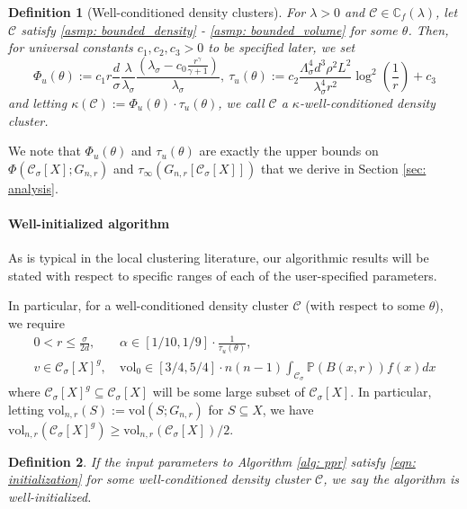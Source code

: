 \documentclass{article}
\newcommand{\vol}{\mathrm{vol}}
\newcommand{\1}{\mathbf{1}}
\newcommand{\Phibf}{\Phi_{u}}
\newcommand{\taubf}{\tau_{u}}
\newcommand{\Xbf}{X}             %
\newcommand{\Pbb}{\mathbb{P}}
\newcommand{\Cbb}{\mathbb{C}}
\newcommand{\Cset}{\mathcal{C}}
\newcommand{\Csig}{\Cset_{\sigma}}
\theoremstyle{aldenthm}
\newtheorem{definition}{Definition}
\theoremstyle{aldenrmrk}
\begin{document}
\begin{definition}[Well-conditioned density clusters]
	For $\lambda > 0$ and $\Cset \in \Cbb_f(\lambda)$, let $\Cset$ satisfy \ref{asmp: bounded_density} - \ref{asmp: bounded_volume} for some $\theta$. Then, for universal constants $c_1, c_2, c_3 > 0$ to be specified later, we set
	\begin{equation}
	\label{eqn: condition_number_1}
	\Phibf(\theta) 
	:= c_1 r \frac{d}{\sigma} \frac{\lambda}{\lambda_{\sigma}} \frac{(\lambda_{\sigma} - c_0 \frac{r^{\gamma}}{\gamma + 1})}{\lambda_{\sigma}},~ 
	\taubf(\theta) := c_2 \frac{\Lambda_{\sigma}^4 d^3 \rho^2 L^2}{\lambda_{\sigma}^4 r^2} \log^2\left(\frac{1}{r}\right) + c_3
	\end{equation}
	and letting $\kappa(\Cset) := \Phi_{u}(\theta) \cdot \tau_{u}(\theta)$, we call $\Cset$ a \textrm{$\kappa$-well-conditioned density cluster}.
\end{definition}

We note that $\Phibf(\theta)$ and $\taubf(\theta)$ are exactly the upper bounds on $\Phi(\Csig[\Xbf]; G_{n,r})$ and $\tau_{\infty}(G_{n,r}[\Csig[\Xbf]])$ that we derive in Section \ref{sec: analysis}.

\paragraph{Well-initialized algorithm}

As is typical in the local clustering literature, our algorithmic results will be stated with respect to specific ranges of each of the user-specified parameters.

In particular, for a well-conditioned density cluster $\Cset$ (with respect to some $\theta$), we require
\begin{align}
\label{eqn: initialization}
0 < r \leq \frac{\sigma}{2d}, & ~\alpha \in [1/10, 1/9] \cdot \frac{1}{\taubf(\theta)} \nonumber,  \\
v \in \Csig[\Xbf]^g, & ~\vol_0 \in [3/4,5/4] \cdot n(n-1) \int_{\Csig} \Pbb(B(x,r)) f(x) dx
\end{align}
where $\Csig[\Xbf]^g \subseteq \Csig[\Xbf]$ will be some large subset of $\Csig[\Xbf]$. In particular, letting $\vol_{n,r}(S) := \vol(S; G_{n,r})$ for $S \subseteq \Xbf$, we have $\vol_{n,r}(\Csig[\Xbf]^g) \geq \vol_{n,r}(\Csig[\Xbf])/2$.

\begin{definition}
	If the input parameters to Algorithm \ref{alg: ppr} satisfy \eqref{eqn: initialization} for some well-conditioned density cluster $\Cset$, we say the algorithm is \emph{well-initialized}.
\end{definition}
\end{document}
